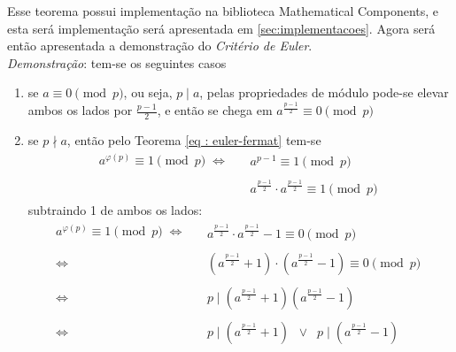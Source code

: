 Esse teorema possui implementação na biblioteca Mathematical Components, e esta será implementação será apresentada em \ref{sec:implementacoes}. 
Agora será então apresentada a demonstração do \textit{Critério de Euler}.
\\
\noindent
\textit{Demonstração}: tem-se os seguintes casos
\begin{enumerate}
    \item se $a \equiv 0 \pmod p$, ou seja, $p \mid a$, pelas propriedades de módulo pode-se elevar ambos os lados por $\frac{p-1}{2}$, e
    então se chega em $a^{\frac{p-1}{2}} \equiv 0 \pmod p$

    \item se $p \nmid a$, então pelo Teorema \ref{eq : euler-fermat} tem-se 
\begin{align*}
        a^{\varphi(p)} \equiv 1  \pmod p \; \Longleftrightarrow
        &\begin{aligned}
            \;\; a^{p - 1} \equiv 1  \pmod p 
        \end{aligned} \\
        &\begin{aligned}
            \;\; a^{\frac{p-1}{2}} \cdot a^{\frac{p-1}{2}} \equiv 1  \pmod p 
        \end{aligned}
\end{align*}
subtraindo 1 de ambos os lados:
\begin{align*}
        a^{\varphi(p)} \equiv 1  \pmod p \; \Longleftrightarrow
        &\begin{aligned}
            \;\; a^{\frac{p-1}{2}} \cdot a^{\frac{p-1}{2}} -1 \equiv 0  \pmod p 
        \end{aligned} \\
        \Longleftrightarrow
        &\begin{aligned}
            \;\; (a^{\frac{p-1}{2}} + 1) \cdot (a^{\frac{p-1}{2}} - 1) \equiv 0  \pmod p 
        \end{aligned} \\
        \Longleftrightarrow
        &\begin{aligned}
            \;\; p \mid (a^{\frac{p-1}{2}} + 1) (a^{\frac{p-1}{2}} - 1)
        \end{aligned} \\
        \Longleftrightarrow
        &\begin{aligned}
            \;\; p \mid (a^{\frac{p-1}{2}} + 1) \;\; \lor \;\; p \mid (a^{\frac{p-1}{2}} - 1)
        \end{aligned} \\

\end{align*}
\end{enumerate}
